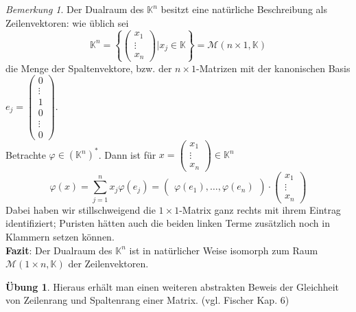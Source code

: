\documentclass[12pt,a4paper]{article}
\theoremstyle{definition}
\newtheorem*{exercise}{Übung}
\theoremstyle{remark}
\newtheorem*{remark}{Bemerkung}
\begin{document}
	\begin{remark}
		Der Dualraum des $\mathbb{K}^n$ besitzt eine natürliche Beschreibung als Zeilenvektoren: wie üblich sei
		\begin{equation}	
			\mathbb{K}^n = \left\{  \begin{pmatrix}
				x_1 \\
				\vdots \\
				x_n
\end{pmatrix} | x_j \in \mathbb{K}	 \right\} = \mathcal{M}(n \times 1, \mathbb{K})
		\end{equation}
		die Menge der Spaltenvektore, bzw. der $n \times 1$-Matrizen mit der kanonischen Basis $e_j = \begin{pmatrix}
			0 \\
			\vdots \\
			1 \\
			0 \\
			\vdots \\
			0
		\end{pmatrix}$.\\
		 Betrachte $\varphi \in (\mathbb{K}^n)^*$. Dann ist für $x = \begin{pmatrix}
		 	x_1 \\
		 	\vdots \\
		 	x_n
		 \end{pmatrix} \in \mathbb{K}^n$
		 \begin{equation}
		 	\varphi(x) = \sum_{j = 1}^n x_j \varphi(e_j)= \begin{pmatrix}
		 		\varphi(e_1), \dots, \varphi(e_n)
		 	\end{pmatrix} \cdot \begin{pmatrix}
		 		x_1 \\
		 		\vdots \\
		 		x_n
		 	\end{pmatrix}
		 \end{equation}
		 Dabei haben wir stillschweigend die $1 \times 1$-Matrix ganz rechts mit ihrem Eintrag identifiziert; Puristen hätten auch die beiden linken Terme zusätzlich noch in Klammern setzen können. \\
		 \textbf{Fazit}: Der Dualraum des $\mathbb{K}^n$ ist in natürlicher Weise isomorph zum Raum $\mathcal{M}(1 \times n, \mathbb{K})$ der Zeilenvektoren.
	\end{remark}
	\begin{exercise}
		Hieraus erhält man einen weiteren abstrakten Beweis der Gleichheit von Zeilenrang und Spaltenrang einer Matrix. (vgl. Fischer Kap. 6)
	\end{exercise} 
\end{document}
